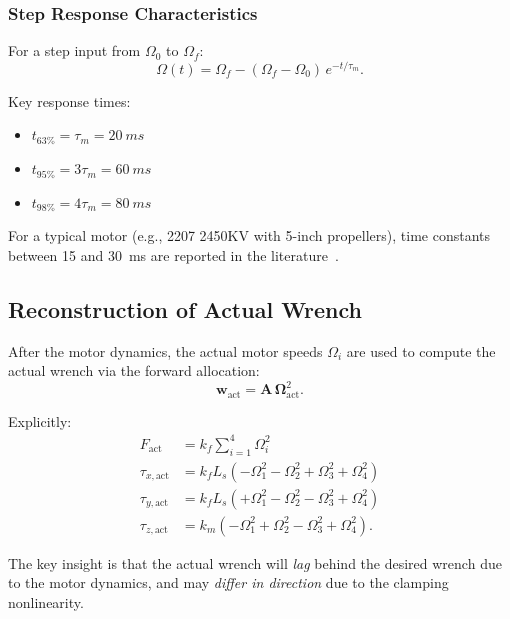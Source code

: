 \documentclass[journal]{IEEEtran}
\newcommand{\w}{\mathbf{w}}
\newcommand{\A}{\mathbf{A}}
\newcommand{\bOmega}{\boldsymbol{\Omega}}
\begin{document}
\subsubsection{Step Response Characteristics}

For a step input from $\Omega_0$ to $\Omega_f$:
\begin{equation}
  \Omega(t) = \Omega_f - (\Omega_f - \Omega_0) \, e^{-t/\tau_m}.
  \label{eq:step_response}
\end{equation}

Key response times:
\begin{itemize}
  \item $t_{63\%} = \tau_m = \SI{20}{ms}$
  \item $t_{95\%} = 3\tau_m = \SI{60}{ms}$
  \item $t_{98\%} = 4\tau_m = \SI{80}{ms}$
\end{itemize}

For a typical motor (e.g., 2207 2450KV with 5-inch propellers), time constants between \SI{15}{} and \SI{30}{ms} are reported in the literature~\cite{faessler2017thrust,shi2019neural}.

\subsection{Reconstruction of Actual Wrench}

After the motor dynamics, the actual motor speeds $\Omega_i$ are used to compute the actual wrench via the forward allocation:
\begin{equation}
  \w_{\text{act}} = \A \, \bOmega_{\text{act}}^2.
  \label{eq:forward_allocation}
\end{equation}

Explicitly:
\begin{align}
  F_{\text{act}}       &= k_f \sum_{i=1}^{4} \Omega_i^2 \label{eq:F_actual} \\
  \tau_{x,\text{act}}  &= k_f L_s \left(-\Omega_1^2 - \Omega_2^2 + \Omega_3^2 + \Omega_4^2\right) \label{eq:tx_actual} \\
  \tau_{y,\text{act}}  &= k_f L_s \left(+\Omega_1^2 - \Omega_2^2 - \Omega_3^2 + \Omega_4^2\right) \label{eq:ty_actual} \\
  \tau_{z,\text{act}}  &= k_m \left(-\Omega_1^2 + \Omega_2^2 - \Omega_3^2 + \Omega_4^2\right). \label{eq:tz_actual}
\end{align}

The key insight is that the actual wrench will \emph{lag} behind the desired wrench due to the motor dynamics, and may \emph{differ in direction} due to the clamping nonlinearity.
\end{document}

